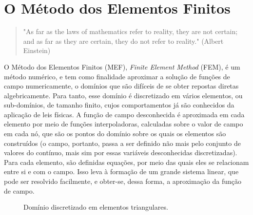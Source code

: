 \chapter{O Método dos Elementos Finitos}

\begin{quote}
    "As far as the laws of mathematics refer to reality, they are not certain; and as far as they are certain, they do not refer to reality." (Albert Einstein)
\end{quote}


O Método dos Elementos Finitos (MEF), \emph{Finite Element Method} (FEM), é um método numérico, e tem como finalidade aproximar a solução de funções de campo numericamente, o domínios que são difíceis de se obter repostas diretas algebricamente. Para tanto, esse domínio é discretizado em vários elementos, ou sub-domínios, de tamanho finito, cujos comportamentos já são conhecidos da aplicação de leis físicas. A função de campo desconhecida é aproximada em cada elemento por meio de funções interpoladoras, calculadas sobre o valor de campo em cada nó, que são os pontos do domínio sobre os quais os elementos são construídos (o campo, portanto, passa a ser definido não mais pelo conjunto de valores do contínuo, mais sim por essas variáveis desconhecidas discretizadas). Para cada elemento, são definidas equações, por meio das quais eles se relacionam entre si e com o campo. Isso leva à formação de um grande sistema linear, que pode ser resolvido facilmente, e obter-se, dessa forma, a aproximação da função de campo. \cite{Onate}

\begin{figure}
	\centering
    \caption{Domínio discretizado em elementos triangulares.}
\end{figure}